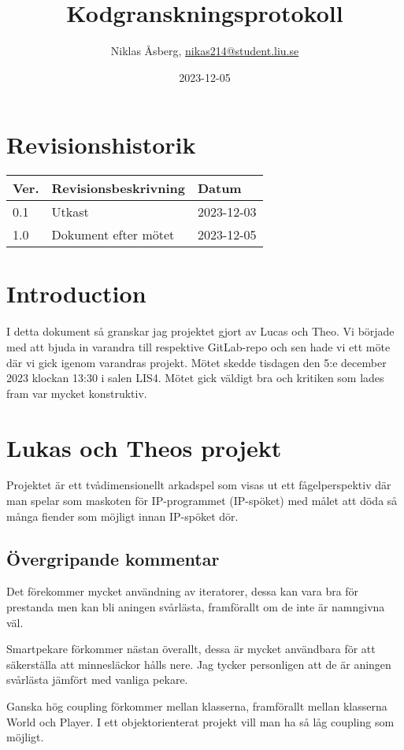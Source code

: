 \documentclass{TDP005mall}
\author{Niklas Åsberg, \url{nikas214@student.liu.se}}
\title{Kodgranskningsprotokoll}
\date{2023-12-05}
\begin{document}
\projectpage
\section{Revisionshistorik}
\begin{table}[!h]
\begin{tabularx}{\linewidth}{|l|X|l|}
\hline
Ver. & Revisionsbeskrivning & Datum \\\hline
0.1 & Utkast & 2023-12-03 \\\hline
1.0 & Dokument efter mötet & 2023-12-05 \\\hline
\end{tabularx}
\end{table}

\tableofcontents
\newpage

\section{Introduction}
I detta dokument så granskar jag projektet gjort av Lucas och Theo.
Vi började med att bjuda in varandra till respektive GitLab-repo och sen hade vi ett möte där vi gick igenom varandras projekt.
Mötet skedde tisdagen den 5:e december 2023 klockan 13:30 i salen LIS4. Mötet gick väldigt bra och kritiken som lades fram var mycket konstruktiv.

\section{Lukas och Theos projekt}
Projektet är ett tvådimensionellt arkadspel som visas ut ett fågelperspektiv där man spelar som maskoten för IP-programmet (IP-spöket) med målet att döda 
så många fiender som möjligt innan IP-spöket dör. 

\subsection{Övergripande kommentar}
Det förekommer mycket användning av iteratorer, dessa kan vara bra för prestanda men kan bli aningen svårlästa, framförallt om de inte är namngivna väl.

Smartpekare förkommer nästan överallt, dessa är mycket användbara för att säkerställa att minnesläckor hålls nere. 
Jag tycker personligen att de är aningen svårlästa jämfört med vanliga pekare.

Ganska hög coupling förkommer mellan klasserna, framförallt mellan klasserna World och Player. I ett objektorienterat projekt 
vill man ha så låg coupling som möjligt.
\end{document}
